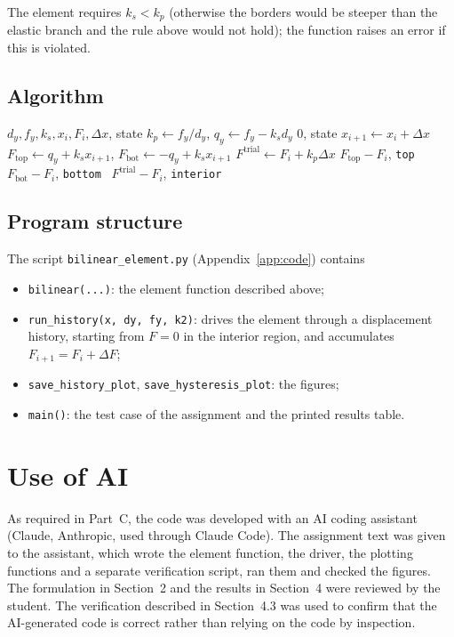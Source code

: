 \documentclass[11pt,a4paper]{article}
\begin{document}
The element requires $k_s < k_p$ (otherwise the borders would be steeper than the elastic branch
and the rule above would not hold); the function raises an error if this is violated.

\subsection{Algorithm}
\begin{algorithm}[H]
\caption{Bilinear element, one displacement step}
\begin{algorithmic}[1]
\Require $d_y, f_y, k_s, x_i, F_i, \Delta x$, state
\State $k_p \gets f_y/d_y$, \quad $q_y \gets f_y - k_s d_y$
 \Return $0$, state \EndIf
\State $x_{i+1} \gets x_i + \Delta x$
\State $F_{\text{top}} \gets q_y + k_s x_{i+1}$, \quad $F_{\text{bot}} \gets -q_y + k_s x_{i+1}$
\State $F^{\text{trial}} \gets F_i + k_p\Delta x$
 \Return $F_{\text{top}} - F_i$, \texttt{top}
 \Return $F_{\text{bot}} - F_i$, \texttt{bottom}
\Else\ \Return $F^{\text{trial}} - F_i$, \texttt{interior}
\EndIf
\end{algorithmic}
\end{algorithm}

\subsection{Program structure}
The script \texttt{bilinear\_element.py} (Appendix~\ref{app:code}) contains
\begin{itemize}
  \item \texttt{bilinear(...)}: the element function described above;
  \item \texttt{run\_history(x, dy, fy, k2)}: drives the element through a displacement history,
        starting from $F = 0$ in the interior region, and accumulates $F_{i+1} = F_i + \Delta F$;
  \item \texttt{save\_history\_plot}, \texttt{save\_hysteresis\_plot}: the figures;
  \item \texttt{main()}: the test case of the assignment and the printed results table.
\end{itemize}

\section{Use of AI}
As required in Part~C, the code was developed with an AI coding assistant (Claude, Anthropic,
used through Claude Code). The assignment text was given to the assistant, which wrote the
element function, the driver, the plotting functions and a separate verification script, ran
them and checked the figures. The formulation in Section~2 and the results in Section~4
were reviewed by the student. The verification described in Section~4.3 was used to confirm
that the AI-generated code is correct rather than relying on the code by inspection.
\end{document}
